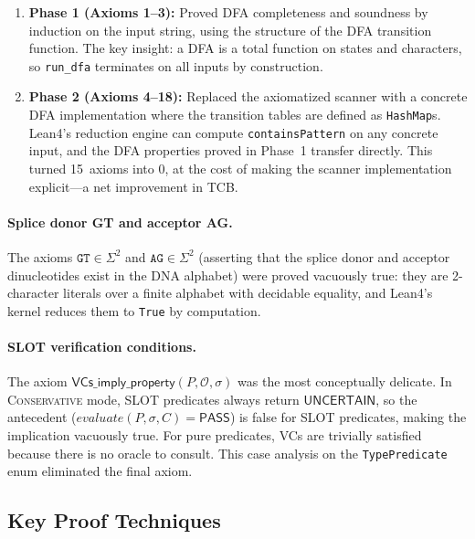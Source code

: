 \documentclass[sigplan,10pt,manuscript,review,anonymous]{acmart}
\newcommand{\PASS}{\ensuremath{\mathsf{PASS}}\xspace}
\newcommand{\UNCERTAIN}{\ensuremath{\mathsf{UNCERTAIN}}\xspace}
\newcommand{\seq}{\sigma}
\newcommand{\pred}{P}
\newcommand{\CONSERVATIVE}{\textsc{Conservative}\xspace}
\begin{document}
\begin{enumerate}[leftmargin=*,itemsep=1pt,topsep=2pt]
\item \textbf{Phase 1 (Axioms 1--3):}
  Proved DFA completeness and soundness by induction on the input
  string, using the structure of the DFA transition function.
  The key insight: a DFA is a total function on states and characters,
  so \texttt{run\_dfa} terminates on all inputs by construction.

\item \textbf{Phase 2 (Axioms 4--18):}
  Replaced the axiomatized scanner with a concrete DFA implementation
  where the transition tables are defined as \texttt{HashMap}s.
  Lean4's reduction engine can compute \texttt{containsPattern} on any
  concrete input, and the DFA properties proved in Phase~1 transfer
  directly.
  This turned 15~axioms into 0, at the cost of making the scanner
  implementation explicit---a net improvement in TCB.
\end{enumerate}

\paragraph{Splice donor GT and acceptor AG.}
The axioms $\texttt{GT} \in \Sigma^2$ and $\texttt{AG} \in \Sigma^2$
(asserting that the splice donor and acceptor dinucleotides exist in the
DNA alphabet) were proved vacuously true: they are 2-character
literals over a finite alphabet with decidable equality, and Lean4's
kernel reduces them to \texttt{True} by computation.

\paragraph{SLOT verification conditions.}
The axiom
$\textsf{VCs\_imply\_property}(\pred, \mathcal{O}, \seq)$
was the most conceptually delicate.
In \CONSERVATIVE{} mode, SLOT predicates always return \UNCERTAIN,
so the antecedent ($\mathit{evaluate}(\pred, \seq, C) = \PASS$)
is false for SLOT predicates, making the implication vacuously true.
For pure predicates, VCs are trivially satisfied because there is no
oracle to consult.
This case analysis on the \texttt{TypePredicate} enum eliminated the
final axiom.

\subsection{Key Proof Techniques}\label{sec:proof-techniques}
\end{document}
